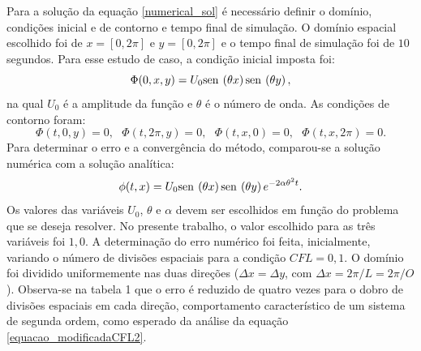 \documentclass[10pt,twoside,a4paper]{article}
\renewcommand{\sin}{{\rm{sen}\hspace{2pt}}}
\begin{document}
	Para a solução da equação \ref{numerical_sol} é necessário definir o domínio, condições inicial e de contorno e tempo final de simulação. O domínio espacial escolhido foi de $x=[0,2\pi]$ e $y=[0,2\pi]$ e o tempo final de simulação foi de $10$ segundos.
	Para esse estudo de caso, a condição inicial imposta foi:
	\begin{equation} \label{condicao_inicial}
	\Phi(0,x,y)=U_0 \sin\left(\theta x\right) \sin\left(\theta y\right), %
	\end{equation}
	na qual $U_0$ é a amplitude da função e $\theta$ é o número de onda. As condições de contorno foram:
	\begin{equation} \label{condicoes_contorno}
	\Phi(t,0,y)=0, \ \ \ \Phi(t,2\pi,y)=0,  \ \ \ \Phi(t,x,0)=0, \ \ \ \Phi(t,x,2\pi)=0.
	\end{equation}
	Para determinar o erro e a convergência do método, comparou-se a solução numérica com a solução analítica:
	\begin{equation} \label{solucao_analitica}
	\phi(t,x)=U_0 \sin\left(\theta x\right) \sin\left(\theta y\right) e^{-2 \alpha \theta^2 t}.
	\end{equation}
	Os valores das variáveis $U_0$, $\theta$ e $\alpha$ devem ser escolhidos em função do problema que se deseja resolver. No presente trabalho, o valor escolhido para as três variáveis foi $1,0$. A determinação do erro numérico foi feita, inicialmente, variando o número de divisões espaciais para a condição $CFL = 0,1$. O domínio foi dividido uniformemente nas duas direções ($\Delta x = \Delta y$, com $\Delta x = 2\pi/L = 2\pi/O$). Observa-se na tabela 1 que o erro é reduzido de quatro vezes para o dobro de divisões espaciais em cada direção, comportamento característico de um sistema de segunda ordem, como esperado da análise da equação \ref{equacao_modificadaCFL2}.
	
	\vspace*{-3mm}
	
\end{document}
